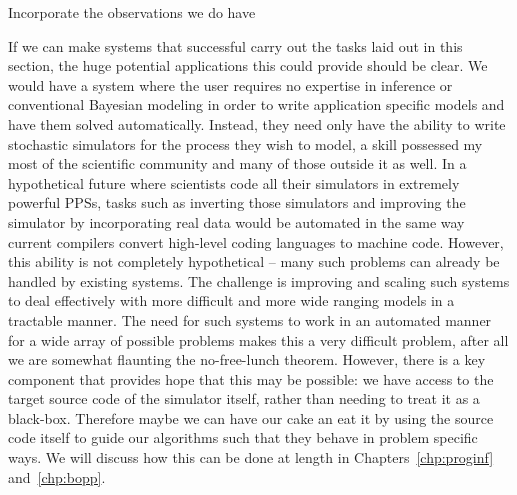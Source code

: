 Incorporate the observations we do have

If we can make systems that successful carry out the tasks laid out in this section, 
the huge potential applications this could provide should be clear. We would have a 
system where the user requires no expertise in inference or conventional
Bayesian modeling in order to write application specific models and have them solved automatically.
Instead, they need only have the ability to write stochastic simulators for the process they wish to
model, a skill possessed my most of the scientific community and many of those outside it as well.
In a hypothetical future where scientists
code all their simulators in extremely powerful PPSs, tasks such as
inverting those simulators and improving the simulator by incorporating real data would
be automated in the same way current compilers convert high-level coding languages to machine code.  
However, this ability is not completely
hypothetical -- many such problems can already be handled by existing systems.  The challenge
is improving and scaling such systems to deal effectively with more difficult and more wide ranging models
in a tractable manner.  The need for such systems to work in an automated manner for a wide array
of possible problems makes this a very difficult problem, after all we are somewhat flaunting the no-free-lunch
theorem.  However, there is a key component that provides hope that this may be possible: we have access
to the target source code of the simulator itself, rather than needing to treat it as a black-box.  Therefore
maybe we can have our cake an eat it by using the source code itself to guide our algorithms such that
they behave in problem specific ways.  We will discuss how this can be done at length in 
Chapters~\ref{chp:proginf} and~\ref{chp:bopp}.